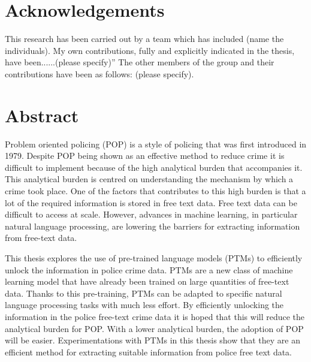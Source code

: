 \documentclass[11pt, a4paper]{book}
\begin{document}
\chapter*{Acknowledgements}
This research has been carried out by a team which has included (name the individuals). My own contributions, fully and explicitly indicated in the thesis, have been......(please specify)” The other members of the group and their contributions have been as follows: (please specify).

\chapter*{Abstract}
Problem oriented policing (POP) is a style of policing that was first introduced in 1979.  Despite POP being shown as an effective method to reduce crime it is difficult to implement because of the high analytical burden that accompanies it. This analytical burden is centred on understanding the mechanism by which a crime took place. One of the factors that contributes to this high burden is that a lot of the required information is stored in free text data. Free text data can be difficult to access at scale. However, advances in machine learning, in particular natural language processing, are lowering the barriers for extracting information from free-text data.

This thesis explores the use of pre-trained language models (PTMs) to efficiently unlock the information in police crime data. PTMs are a new class of machine learning model that have already been trained on large quantities of free-text data. Thanks to this pre-training, PTMs can be adapted to specific natural language processing tasks with much less effort. By efficiently unlocking the information in the police free-text crime data it is hoped that this will reduce the analytical burden for POP. With a lower analytical burden, the adoption of POP will be easier. Experimentations with PTMs in this thesis show that they are an efficient method for extracting suitable information from police free text data.


\newpage ~ \newpage
{}
\setcounter{page}{1}




\tableofcontents
\pagestyle{plain}
\newpage 

\listoffigures 

\newpage 

\listoftables

\newpage 
{}
\setcounter{page}{1}
\end{document}
